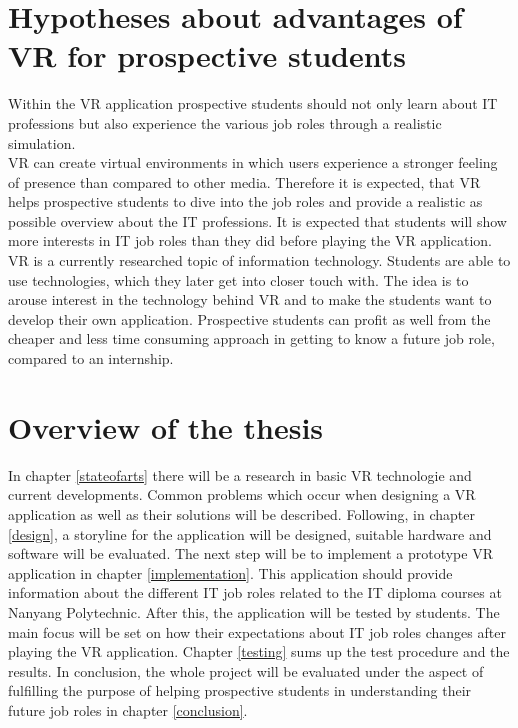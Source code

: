 \section{Hypotheses about advantages of VR for prospective students}
Within the VR application prospective students should not only learn about IT professions but also experience the various job roles through a realistic simulation.\\
VR can create virtual environments in which users experience a stronger feeling of presence than compared to other media. Therefore it is expected, that VR helps prospective students to dive into the job roles and provide a realistic as possible overview about the IT professions. It is expected that students will show more interests in IT job roles than they did before playing the VR application. \\
VR is a currently researched topic of information technology. Students are able to use technologies, which they later get into closer touch with. The idea is to arouse interest in the technology behind VR and to make the students want to develop their own application. Prospective students can profit as well from the cheaper and less time consuming approach in getting to know a future job role, compared to an internship. 


\section{Overview of the thesis}
In chapter \ref{stateofarts} there will be a  research in basic VR technologie and current developments. Common problems which occur when designing a VR application as well as their solutions will be described. Following, in chapter \ref{design}, a storyline for the application will be designed, suitable hardware and software will be evaluated. The next step will be to implement a prototype VR application in chapter \ref{implementation}. This application should provide information about the different IT job roles related to the IT diploma courses at Nanyang Polytechnic. After this, the application will be tested by students. The main focus will be set on how their expectations about IT job roles changes after playing the VR application. Chapter \ref{testing} sums up the test procedure and the results. In conclusion, the whole project will be evaluated under the aspect of fulfilling the purpose of helping prospective students in understanding their future job roles in chapter \ref{conclusion}.

